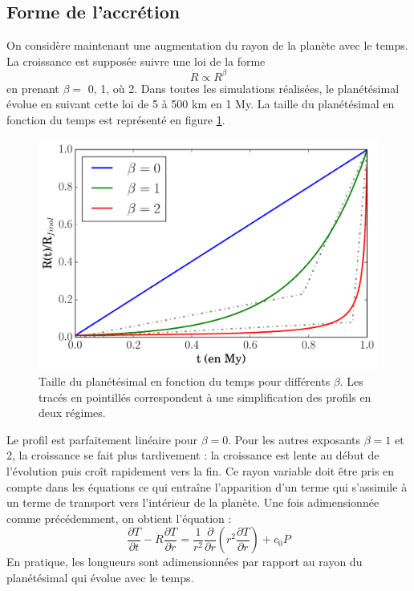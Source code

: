 \documentclass[10pt,a4paper]{article}
\numberwithin{equation}{section}
\begin{document}
\subsection{Forme de l'accrétion}

On considère maintenant une augmentation du rayon de la planète avec le temps. La croissance est supposée suivre une loi de la forme 
\begin{equation}
\dot{R} \propto R^\beta
\end{equation}
en prenant $\beta =$ 0, 1,  où 2. Dans toutes les simulations réalisées, le planétésimal évolue en suivant cette loi de 5 à 500 km en 1 My. La taille du planétésimal en fonction du temps est représenté en figure \ref{rayon}.

\begin{figure}[h]
    \centering	    
	\includegraphics[scale=0.43]{figures/rayon.pdf}
    \caption{Taille du planétésimal en fonction du temps pour différents $\beta$. Les tracés en pointillés correspondent à une simplification des profils en deux régimes.}
    	\label{rayon} 
\end{figure}

Le profil est parfaitement linéaire pour $\beta = 0$. Pour les autres exposants $\beta = 1$ et 2, la croissance se fait plus tardivement : la croissance est lente au début de l'évolution puis croît rapidement vers la fin. Ce rayon variable doit être pris en compte dans les équations ce qui entraîne l'apparition d'un terme qui s'assimile à un terme de transport vers l'intérieur de la planète. Une fois adimensionnée comme précédemment, on obtient l'équation :
\begin{equation}
\dfrac{\partial T}{\partial t} - \dot{R} \dfrac{\partial T}{\partial r} = \frac{1}{r^2} \dfrac{\partial }{\partial r}\left( r^2 \dfrac{\partial T}{\partial r} \right) + c_0P
\label{accretion_adim}
\end{equation}
En pratique, les longueurs sont adimensionnées par rapport au rayon du planétésimal qui évolue avec le temps.
\end{document}
